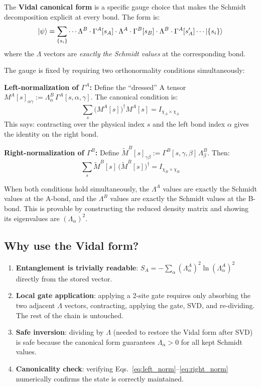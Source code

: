 \documentclass[11pt, a4paper]{article}
\begin{document}
The \textbf{Vidal canonical form} is a specific gauge choice that makes the Schmidt decomposition explicit at every bond. The form is:
\begin{equation*}
  \ket{\psi} = \sum_{\{s_i\}} \cdots \Lambda^B \cdot \Gamma^A[s_A] \cdot \Lambda^A \cdot \Gamma^B[s_B] \cdot \Lambda^B \cdot \Gamma^A[s_A'] \cdots \ket{\{s_i\}}
\end{equation*}
where the $\Lambda$ vectors are \emph{exactly the Schmidt values} at the corresponding bond.

The gauge is fixed by requiring two orthonormality conditions simultaneously:

\textbf{Left-normalization of $\Gamma^A$:}
Define the ``dressed'' A tensor $M^A[s]_{\alpha\gamma} := \Lambda^B_\alpha\, \Gamma^A[s, \alpha, \gamma]$. The canonical condition is:
\begin{equation}
  \sum_{s} \bigl(M^A[s]\bigr)^\dagger M^A[s] = I_{\chi_A \times \chi_A}
  \label{eq:left_norm}
\end{equation}
This says: contracting over the physical index $s$ and the left bond index $\alpha$ gives the identity on the right bond.

\textbf{Right-normalization of $\Gamma^B$:}
Define $\tilde{M}^B[s]_{\gamma\beta} := \Gamma^B[s, \gamma, \beta]\, \Lambda^B_\beta$. Then:
\begin{equation}
  \sum_{s} \tilde{M}^B[s]\, \bigl(\tilde{M}^B[s]\bigr)^\dagger = I_{\chi_B \times \chi_B}
  \label{eq:right_norm}
\end{equation}

When both conditions hold simultaneously, the $\Lambda^A$ values are exactly the Schmidt values at the A-bond, and the $\Lambda^B$ values are exactly the Schmidt values at the B-bond. This is provable by constructing the reduced density matrix and showing its eigenvalues are $(\Lambda_\alpha)^2$.

\subsection{Why use the Vidal form?}

\begin{enumerate}
  \item \textbf{Entanglement is trivially readable}: $S_A = -\sum_\alpha (\Lambda^A_\alpha)^2 \ln(\Lambda^A_\alpha)^2$ directly from the stored vector.
  \item \textbf{Local gate application}: applying a 2-site gate requires only absorbing the two adjacent $\Lambda$ vectors, contracting, applying the gate, SVD, and re-dividing. The rest of the chain is untouched.
  \item \textbf{Safe inversion}: dividing by $\Lambda$ (needed to restore the Vidal form after SVD) is safe because the canonical form guarantees $\Lambda_\alpha > 0$ for all kept Schmidt values.
  \item \textbf{Canonicality check}: verifying Eqs.~\eqref{eq:left_norm}--\eqref{eq:right_norm} numerically confirms the state is correctly maintained.
\end{enumerate}
\end{document}
